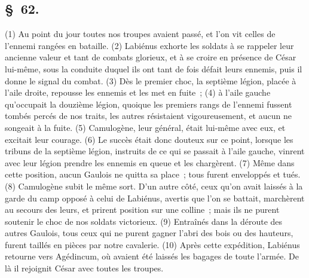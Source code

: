 \documentclass[french,twoside]{book} %
\begin{document}
\subsection[{§ 62.}]{ \textsc{§ 62.} }
\noindent (1) Au point du jour toutes nos troupes avaient passé, et l’on vit celles de l’ennemi rangées en bataille. (2) Labiénus exhorte les soldats à se rappeler leur ancienne valeur et tant de combats glorieux, et à se croire en présence de César lui-même, sous la conduite duquel ils ont tant de fois défait leurs ennemis, puis il donne le signal du combat. (3) Dès le premier choc, la septième légion, placée à l’aile droite, repousse les ennemis et les met en fuite ; (4) à l’aile gauche qu’occupait la douzième légion, quoique les premiers rangs de l’ennemi fussent tombés percés de nos traits, les autres résistaient vigoureusement, et aucun ne songeait à la fuite. (5) Camulogène, leur général, était lui-même avec eux, et excitait leur courage. (6) Le succès était donc douteux sur ce point, lorsque les tribuns de la septième légion, instruits de ce qui se passait à l’aile gauche, vinrent avec leur légion prendre les ennemis en queue et les chargèrent. (7) Même dans cette position, aucun Gaulois ne quitta sa place ; tous furent enveloppés et tués. (8) Camulogène subit le même sort. D'un autre côté, ceux qu’on avait laissés à la garde du camp opposé à celui de Labiénus, avertis que l’on se battait, marchèrent au secours des leurs, et prirent position sur une colline ; mais ils ne purent soutenir le choc de nos soldats victorieux. (9) Entraînés dans la déroute des autres Gaulois, tous ceux qui ne purent gagner l’abri des bois ou des hauteurs, furent taillés en pièces par notre cavalerie. (10) Après cette expédition, Labiénus retourne vers Agédincum, où avaient été laissés les bagages de toute l’armée. De là il rejoignit César avec toutes les troupes.
\end{document}
